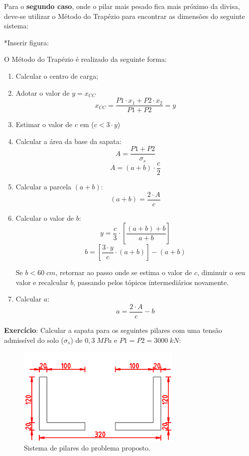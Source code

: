 Para o \textbf{segundo caso}, onde o pilar mais pesado fica mais próximo da divisa, deve-se utilizar o Método do Trapézio para encontrar as dimensões do seguinte sistema:

*Inserir figura:

O Método do Trapézio é realizado da seguinte forma:
\begin{enumerate}
	\item Calcular o centro de carga;
	\item Adotar o valor de $y=x_{CC}$
		\begin{equation}x_{CC}=\frac{P1\cdot x_1+P2\cdot x_2}{P1+P2}=y\end{equation}
	\item Estimar o valor de $c$ em ($c<3\cdot y$)
	\item Calcular a área da base da sapata:
		$$A=\frac{P1+P2}{\sigma_s}$$
		\begin{equation}A=(a+b)\cdot \frac{c}{2}\end{equation}
	\item Calcular a parcela $(a+b)$:
		\begin{equation}(a+b)=\frac{2\cdot A}{c}\end{equation}
	\item Calcular o valor de $b$:
		$$y=\frac{c}{3}\cdot\left[\frac{(a+b)+b}{a+b}\right]$$
		\begin{equation}b=\left[\frac{3\cdot y}{c}\cdot(a+b)\right]-(a+b)\end{equation}
	
	Se $b<60\;cm$, retornar ao passo onde se estima o valor de $c$, diminuir o seu valor e recalcular $b$, passando pelos tópicos intermediários novamente.
	\item Calcular $a$:
		\begin{equation}a=\frac{2\cdot A}{c}-b\end{equation}
\end{enumerate}

\textbf{Exercício}: Calcular a sapata para os seguintes pilares com uma tensão admissível do solo ($\sigma_s$) de $0,3\;MPa$ e $P1=P2=3000\;kN$:
\begin{figure}[H]
	\begin{center}
	\caption{Sistema de pilares do problema proposto.}
    	\includegraphics[width=0.7\textwidth]{Fundacoes-rasas-ou-diretas/Imagens/Exercicio-1-Sapata-conjugada.png}
	\end{center}
\end{figure}

